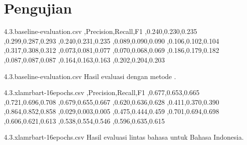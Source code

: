 \section{Pengujian}


\begin{filecontents*}{4.3.baseline-evaluation.csv}
  {},Precision,Recall,F1
  ,0.240,0.230,0.235
  ,0.299,0.287,0.293
  ,0.240,0.231,0.235
  ,0.089,0.090,0.090
  ,0.106,0.102,0.104
  ,0.317,0.308,0.312
  ,0.073,0.081,0.077
  ,0.070,0.068,0.069
  ,0.186,0.179,0.182
  ,0.087,0.087,0.087
  ,0.164,0.163,0.163
  ,0.202,0.204,0.203
\end{filecontents*}
  {4.3.baseline-evaluation.csv}
  {Hasil evaluasi  dengan metode .}


\begin{filecontents*}{4.3.xlamrbart-16epochs.csv}
  {},Precision,Recall,F1
  ,0.677,0.653,0.665
  ,0.721,0.696,0.708
  ,0.679,0.655,0.667
  ,0.620,0.636,0.628
  ,0.411,0.370,0.390
  ,0.864,0.852,0.858
  ,0.029,0.003,0.005
  ,0.475,0.444,0.459
  ,0.701,0.694,0.698
  ,0.606,0.621,0.613
  ,0.538,0.554,0.546
  ,0.596,0.635,0.615
\end{filecontents*}
  {4.3.xlamrbart-16epochs.csv}
  {Hasil evaluasi  lintas bahasa untuk Bahasa Indonesia.}
